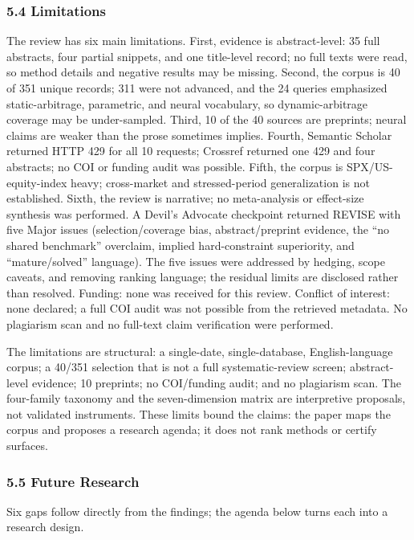 \documentclass[11pt]{article}
\begin{document}
\subsubsection*{5.4 Limitations}
The review has six main limitations. First, evidence is abstract-level: 35 full abstracts, four partial snippets, and one title-level record; no full texts were read, so method details and negative results may be missing. Second, the corpus is 40 of 351 unique records; 311 were not advanced, and the 24 queries emphasized static-arbitrage, parametric, and neural vocabulary, so dynamic-arbitrage coverage may be under-sampled. Third, 10 of the 40 sources are preprints; neural claims are weaker than the prose sometimes implies. Fourth, Semantic Scholar returned HTTP 429 for all 10 requests; Crossref returned one 429 and four abstracts; no COI or funding audit was possible. Fifth, the corpus is SPX/US-equity-index heavy; cross-market and stressed-period generalization is not established. Sixth, the review is narrative; no meta-analysis or effect-size synthesis was performed. A Devil’s Advocate checkpoint returned REVISE with five Major issues (selection/coverage bias, abstract/preprint evidence, the “no shared benchmark” overclaim, implied hard-constraint superiority, and “mature/solved” language). The five issues were addressed by hedging, scope caveats, and removing ranking language; the residual limits are disclosed rather than resolved. Funding: none was received for this review. Conflict of interest: none declared; a full COI audit was not possible from the retrieved metadata. No plagiarism scan and no full-text claim verification were performed.

The limitations are structural: a single-date, single-database, English-language corpus; a 40/351 selection that is not a full systematic-review screen; abstract-level evidence; 10 preprints; no COI/funding audit; and no plagiarism scan. The four-family taxonomy and the seven-dimension matrix are interpretive proposals, not validated instruments. These limits bound the claims: the paper maps the corpus and proposes a research agenda; it does not rank methods or certify surfaces.

\subsubsection*{5.5 Future Research}
Six gaps follow directly from the findings; the agenda below turns each into a research design.
\end{document}
